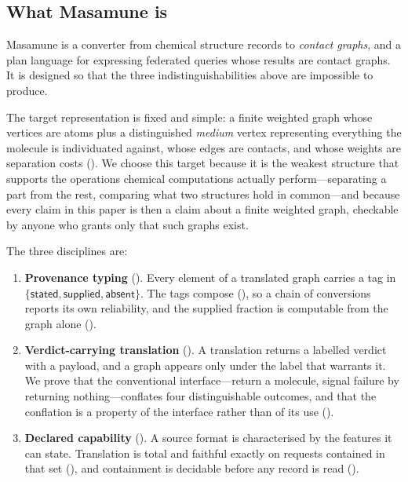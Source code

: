 \documentclass[11pt,twocolumn,a4paper]{article}
\theoremstyle{msthm}
\theoremstyle{definition}
\theoremstyle{remark}
\newcommand{\stated}{\textsf{stated}}
\newcommand{\supplied}{\textsf{supplied}}
\newcommand{\absent}{\textsf{absent}}
\begin{document}
\subsection{What Masamune is}

Masamune is a converter from chemical structure records to \emph{contact
graphs}, and a plan language for expressing federated queries whose
results are contact graphs. It is designed so that the three
indistinguishabilities above are impossible to produce.

The target representation is fixed and simple: a finite weighted graph
whose vertices are atoms plus a distinguished \emph{medium} vertex
representing everything the molecule is individuated against, whose
edges are contacts, and whose weights are separation costs
(). We choose this target because it is the weakest
structure that supports the operations chemical computations actually
perform---separating a part from the rest, comparing what two structures
hold in common---and because every claim in this paper is then a claim
about a finite weighted graph, checkable by anyone who grants only that
such graphs exist.

The three disciplines are:

\begin{enumerate}[label=(D\arabic*),leftmargin=3em,itemsep=3pt]
\item \textbf{Provenance typing} (). Every element
of a translated graph carries a tag in $\{\stated,\supplied,\absent\}$.
The tags compose (), so a chain of conversions
reports its own reliability, and the supplied fraction is computable
from the graph alone ().

\item \textbf{Verdict-carrying translation} (). A
translation returns a labelled verdict with a payload, and a graph
appears only under the label that warrants it. We prove that the
conventional interface---return a molecule, signal failure by returning
nothing---conflates four distinguishable outcomes, and that the
conflation is a property of the interface rather than of its use
().

\item \textbf{Declared capability} (). A source
format is characterised by the features it can state. Translation is
total and faithful exactly on requests contained in that set
(), and containment is decidable before any record
is read ().
\end{enumerate}
\end{document}
